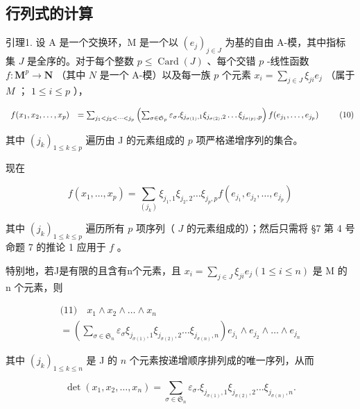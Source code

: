 \subsection{行列式的计算}

引理1. 设 A 是一个交换环，M 是一个以 \((e_j)_{j \in J}\) 为基的自由 A-模，其中指标集 \(J\) 是全序的。对于每个整数 \(p \leqslant \operatorname{Card}(J)\) 、每个交错 \(p\) -线性函数 \(f: \mathbf{M}^p \to \mathbf{N}\) （其中 \(N\) 是一个 A-模）以及每一族 \(p\) 个元素 \(x_i = \sum_{j \in J} \xi_{ji} e_j\) （属于 \(M\) ； \(1 \leqslant i \leqslant p\) ），

\[
\begin{array}{r l} f (x _ {1}, x _ {2}, \dots , x _ {p}) & = \sum_ {j _ {1} <   j _ {2} <   \dots <   j _ {p}} \left(\sum_ {\sigma \in \mathfrak {S} _ {p}} \varepsilon_ {\sigma}. \xi_ {j _ {\sigma (1)}, 1} \xi_ {j _ {\sigma (2)}, 2} \dots \xi_ {j _ {\sigma (p)}, p}\right) f (e _ {j _ {1}}, \dots , e _ {j _ {p}}) \end{array}\tag{10}
\]

其中 \((j_k)_{1\leqslant k\leqslant p}\) 遍历由 J 的元素组成的 \(p\) 项严格递增序列的集合。

现在

\[
f (x _ {1}, \dots , x _ {p}) = \sum_ {(j _ {k})} \xi_ {j _ {1}, 1} \xi_ {j _ {2}, 2} \dots \xi_ {j _ {p}, p} f (e _ {j _ {1}}, e _ {j _ {2}}, \dots , e _ {j _ {p}})
\]

其中 \((j_k)_{1 \leqslant k \leqslant p}\) 遍历所有 \(p\) 项序列（ \(J\) 的元素组成的）；然后只需将 §7 第 4 号命题 7 的推论 1 应用于 \(f\) 。

特别地，若J是有限的且含有n个元素，且 \(x_{i} = \sum_{j \in J} \xi_{ji} e_{j} (1 \leqslant i \leqslant n)\) 是 M 的 n 个元素，则

\[
\begin{array}{l} \text {(11)} \quad x _ {1} \wedge x _ {2} \wedge \dots \wedge x _ {n} \\ = \left(\sum_ {\sigma \in \mathfrak {S} _ {n}} \varepsilon_ {\sigma} \xi_ {j _ {\sigma (1)}, 1} \xi_ {j _ {\sigma (2)}, 2} \dots \xi_ {j _ {\sigma (n)}, n}\right) e _ {j _ {1}} \wedge e _ {j _ {2}} \wedge \dots \wedge e _ {j _ {n}} \end{array}
\]

其中 \((j_k)_{1\leqslant k\leqslant n}\) 是 J 的 \(n\) 个元素按递增顺序排列成的唯一序列，从而

\[
\det (x _ {1}, x _ {2}, \dots , x _ {n}) = \sum_ {\sigma \in \mathfrak {S} _ {n}} \varepsilon_ {\sigma}. \xi_ {j _ {\sigma (1)}, 1} \xi_ {j _ {\sigma (2)}, 2} \dots \xi_ {j _ {\sigma (n)}, n}.\tag{12}
\]

